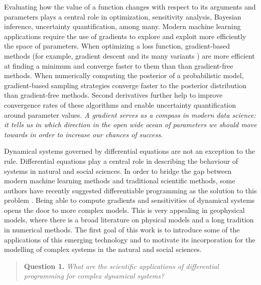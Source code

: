 

Evaluating how the value of a function changes with respect to its arguments and parameters plays a central role in optimization, sensitivity analysis, Bayesian inference, uncertainty quantification, among many. 
Modern machine learning applications require the use of gradients to explore and exploit more efficiently the space of parameters. 
When optimizing a loss function, gradient-based methods (for example, gradient descent and its many variants \cite{ruder2016overview-gradient-descent}) are more efficient at finding a minimum and converge faster to them than than gradient-free methods.
When numerically computing the posterior of a probabilistic model, gradient-based sampling strategies converge faster to the posterior distribution than gradient-free methods. 
Second derivatives further help to improve convergence rates of these algorithms and enable uncertainty quantification around parameter values.
\textit{A gradient serves as a compass in modern data science: it tells us in which direction in the open wide ocean of parameters we should move towards in order to increase our chances of success}.  

Dynamical systems governed by differential equations are not an exception to the rule.
Differential equations play a central role in describing the behaviour of systems in natural and social sciences. 
In order to bridge the gap between modern machine learning methods and traditional scientific methods, some authors have recently suggested differentiable programming as the solution to this problem \cite{Ramsundar_Krishnamurthy_Viswanathan_2021, Shen_diff_modelling}. 
Being able to compute gradients and sensitivities of dynamical systems opens the door to more complex models.
This is very appealing in geophysical models, where there is a broad literature on physical models and a long tradition in numerical methods. 
The first goal of this work is to introduce some of the applications of this emerging technology and to motivate its incorporation for the modelling of complex systems in the natural and social sciences. 
\begin{quote}
    \textbf{Question 1. }
    \textit{What are the scientific applications of differential programming for complex dynamical systems?}
\end{quote}

